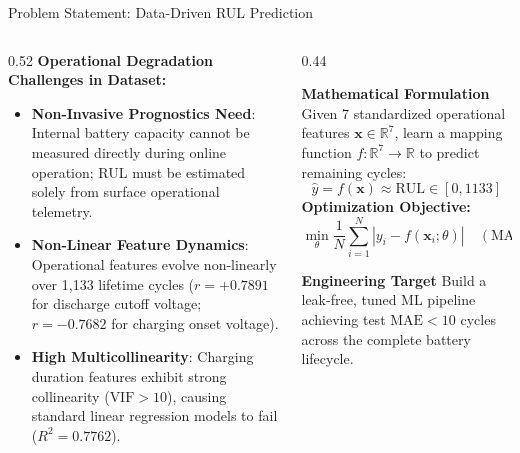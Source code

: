 \documentclass[aspectratio=169, 10pt]{beamer}
\begin{document}
\begin{frame}{Problem Statement: Data-Driven RUL Prediction}
\begin{columns}[T]
  \begin{column}{0.52\textwidth}
    \textbf{Operational Degradation Challenges in Dataset:}
    \begin{itemize}\footnotesize
      \item \textbf{Non-Invasive Prognostics Need}: Internal battery capacity cannot be measured directly during online operation; RUL must be estimated solely from surface operational telemetry.
      \item \textbf{Non-Linear Feature Dynamics}: Operational features evolve non-linearly over 1,133 lifetime cycles ($r = +0.7891$ for discharge cutoff voltage; $r = -0.7682$ for charging onset voltage).
      \item \textbf{High Multicollinearity}: Charging duration features exhibit strong collinearity ($\text{VIF} > 10$), causing standard linear regression models to fail ($R^2 = 0.7762$).
    \end{itemize}
  \end{column}

  \begin{column}{0.44\textwidth}
    \begin{block}{\textbf{Mathematical Formulation}}
      \footnotesize
      Given 7 standardized operational features $\mathbf{x} \in \mathbb{R}^7$, learn a mapping function $f: \mathbb{R}^7 \to \mathbb{R}$ to predict remaining cycles:
      $$\hat{y} = f(\mathbf{x}) \approx \text{RUL} \in [0, 1133]$$
      \textbf{Optimization Objective:}
      $$\min_{\theta} \frac{1}{N}\sum_{i=1}^{N} |y_i - f(\mathbf{x}_i; \theta)| \quad (\text{MAE})$$
    \end{block}
    \vspace{0.2em}
    \begin{alertblock}{\textbf{Engineering Target}}
      \scriptsize Build a leak-free, tuned ML pipeline achieving test $\text{MAE} < 10$ cycles across the complete battery lifecycle.
    \end{alertblock}
  \end{column}
\end{columns}
\end{frame}
\end{document}
